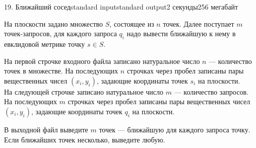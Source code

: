 \begin{problem}{19. Ближайший сосед}{standard input}{standard output}{2 секунды}{256 мегабайт}

На плоскости задано множество $S$, состоящее из $n$ точек. Далее поступает $m$ точек-запросов, для каждого запроса $q_i$ надо вывести ближайшую к нему в евклидовой метрике точку $s \in S$.

\InputFile

На первой строчке входного файла записано натуральное число $n$ — количество точек в множестве. На последующих $n$ строчках через пробел записаны пары вещественных чисел $(x_i, y_i)$, задающие координаты точек $s_i$ на плоскости. \\
На следующей строчке записано натуральное число $m$ — количество запросов. На последующих $m$ строчках через пробел записаны пары вещественных чисел $(x_i, y_i)$, задающие координаты точек $q_i$ на плоскости. 

\OutputFile
В выходной файл выведите $m$ точек — ближайшую для каждого запроса точку. Если ближайших точек несколько, выведите любую.

\Examples

\begin{example}%
%
\end{example}

\begin{example}
%
\end{example}

\end{problem}
